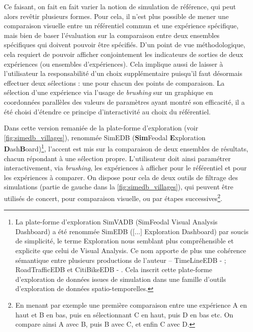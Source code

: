 	Ce faisant, on fait en fait varier la notion de \og simulation de référence\fg{}, qui peut alors revêtir plusieurs formes.
	Pour cela, il n'est plus possible de mener une comparaison visuelle entre un référentiel commun et une expérience spécifique, mais bien de baser l'évaluation sur la comparaison entre deux ensembles spécifiques qui doivent pouvoir être spécifiés.
	D'un point de vue méthodologique, cela requiert de pouvoir afficher conjointement les indicateurs de sorties de deux expériences (ou ensembles d'expériences).
	Cela implique aussi de laisser à l'utilisateur la responsabilité d'un choix supplémentaire puisqu'il faut désormais effectuer deux sélections : une pour chacun des points de comparaison.
	La sélection d'une expérience via l'usage de \textit{brushing} sur un graphique en coordonnées parallèles des valeurs de paramètres ayant montré son efficacité, il a été choisi d'étendre ce principe d'interactivité au choix du référentiel.
	
	Dans cette version remaniée de la plate-forme d'exploration (voir \cref{fig:simedb_villages}), renommée SimEDB\label{par:introduction-nom-simedb} (\textbf{Sim}Feodal \textbf{E}xploration \textbf{D}ash\textbf{B}oard)\footnote{
		\label{ftn:origine-simedb}
		La plate-forme d'exploration SimVADB (SimFeodal Visual Analysis Dashboard) a été renommée SimEDB ([...] Exploration Dashboard) par soucis de simplicité, le terme \og Exploration\fg{} nous semblant plus compréhensible et explicite que celui de Visual Analysis.
		Ce nom apporte de plus une cohérence sémantique entre plusieurs productions de l'auteur -- TimeLineEDB - \autocite{cura_timelineedb_2017}; RoadTrafficEDB et CitiBikeEDB - \autocite{cura_making_2017}.
		Cela inscrit cette plate-forme d'exploration de données issues de simulation dans une \og famille \fg{} d'outils d'exploration de données spatio-temporelles.
	}, l'accent est mis sur la comparaison de deux ensembles de résultats, chacun répondant à une sélection propre.
	L'utilisateur doit ainsi \og paramétrer\fg{} interactivement, via \textit{brushing}, les expériences à afficher pour le référentiel et pour les expériences à comparer.
	On dispose pour cela de deux outils de filtrage des simulations (partie de gauche dans la \cref{fig:simedb_villages}), qui peuvent être utilisés de concert, pour comparaison visuelle, ou par étapes successives\footnote{
		En menant par exemple une première comparaison entre une expérience \og A\fg{} en haut et \og B\fg{} en bas, puis en sélectionnant \og C\fg{} en haut, puis \og D\fg{} en bas etc.
		On compare ainsi A avec B, puis B avec C, et enfin C avec D.
	}.

